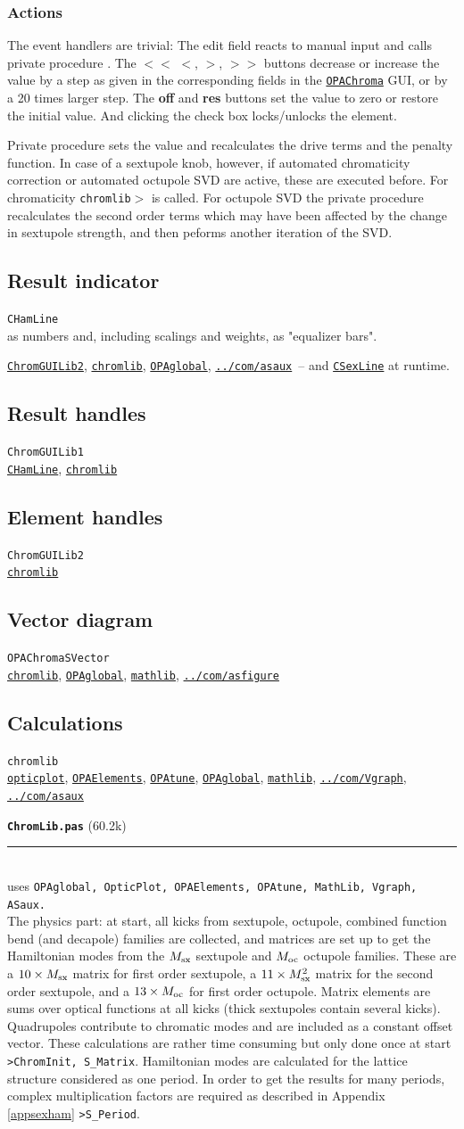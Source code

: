 \documentclass[12pt]{article}
\newcommand\code[1]{{\tt #1}}
\newcommand{\ofld}[1]{\colorbox{black!15}{{\bf #1}}}
\newcommand\guifco[1]{{\color{violet}\code{#1}}}
\newcommand{\unico}[1]{{\color{burntorange}\code{#1}}}
\newcommand{\prcod}[2]{\opauni{#1}$>$\unico{#2}}
\newcommand{\opagui}[1]{\colorbox{blue!20}{\code{#1}}}
\newcommand{\oguih}[2]{\subsection{\label{#2}#1}{\Huge\opagui{#2}}\\}
\newcommand{\ogui}[1]{\hyperref[#1]{\opagui{#1}}}
\newcommand{\opaguif}[1]{\colorbox{violet!30}{\code{#1}}}
\newcommand{\oguifh}[2]{\subsection{\label{#2}#1}{\Huge\opaguif{#2}}\\}
\newcommand{\oguif}[1]{\hyperref[#1]{\opaguif{#1}}}
\newcommand{\opauni}[1]{\colorbox{orange!30}{\code{#1}}}
\newcommand{\ounih}[2]{\subsection{\label{#2}#1}{\Huge\opauni{#2}}\\}
\newcommand{\ouni}[1]{\hyperref[#1]{\opauni{#1}}}
\newcommand{\uses}[1]{\flushleft {\bf Uses:} #1}
\newcommand{\act}[1]{\subsubsection*{Actions} #1}
\newcommand\opamodule[3]{{\bf \tt #1} #2\\  \rule[3pt]{\textwidth}{0.2pt} \\ {\scriptsize uses \tt  #3}\\[1ex]}
\begin{document}
\act{
The event handlers are trivial: The edit field reacts to manual input and calls private procedure \guifco{UpdateVal}. The \ofld{$<<$} \ofld{$<$}, \ofld{$>$}, \ofld{$>>$} buttons decrease or increase the value by a step as given in the corresponding fields in the \ogui{OPAChroma} GUI, or by a 20 times larger step. The \ofld{off} and \ofld{res} buttons set the value to zero or restore the initial value. And clicking the check box locks/unlocks the element.

Private procedure \guifco{UpdateVal} sets the value and recalculates the drive terms and the penalty function. In case of a sextupole knob, however, if automated chromaticity correction or automated octupole SVD are active, these are executed before. For chromaticity \prcod{chromlib}{ChromCorrect} is called. For octupole SVD the private procedure \guifco{OsvdStep} recalculates the second order terms which may have been affected by the change in sextupole strength, and then peforms another iteration of the SVD. 
}


\oguifh{Result indicator}{CHamLine} 

 as numbers and, including scalings and weights, as "equalizer bars".


\uses{
\ouni{ChromGUILib2},  \ouni{chromlib}, \ouni{OPAglobal}, \ouni{../com/asaux}~-- and \oguif{CSexLine} at runtime.
}


\ounih{Result handles}{ChromGUILib1} 

\uses{
\oguif{CHamLine}, \ouni{chromlib}
}


\ounih{Element handles}{ChromGUILib2} 

\uses{ \ouni{chromlib} }


\oguih{Vector diagram}{OPAChromaSVector} 

\uses{
\ouni{chromlib}, \ouni{OPAglobal}, \ouni{mathlib}, \ouni{../com/asfigure}
}

\ounih{Calculations}{chromlib} 

\uses{
\ouni{opticplot}, \ouni{OPAElements}, \ogui{OPAtune}, \ouni{OPAglobal}, \ouni{mathlib}, \oguif{../com/Vgraph}, \ouni{../com/asaux}
}



\opamodule{ChromLib.pas}{(60.2k)}{OPAglobal, OpticPlot, OPAElements, OPAtune,  MathLib, Vgraph, ASaux.}
The physics part: at start, all kicks from sextupole, octupole, combined function bend (and decapole) families are collected, and matrices are set up to get the Hamiltonian modes from the $M_{\rm sx}$ sextupole and $M_{\rm oc}$ octupole families. These are a $10\times  M_{\rm sx}$ matrix for first order sextupole, a $11\times  M_{\rm sx}^2$ matrix for the second order sextupole, and a  $13\times  M_{\rm oc}$ for first order octupole. Matrix elements are sums over optical functions at all kicks (thick sextupoles contain several kicks). Quadrupoles contribute to chromatic modes and are included as a constant offset vector. These calculations are rather time consuming but only done once at start \code{>ChromInit, S\_Matrix}. Hamiltonian modes are calculated for the lattice structure considered as one period. In order to get the results for many periods, complex multiplication factors are required as described in Appendix \ref{appsexham} \code{>S\_Period}.
\end{document}
